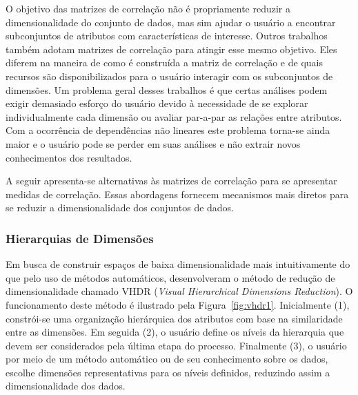 O objetivo das matrizes de correlação não é propriamente
reduzir a dimensionalidade do conjunto de dados, mas sim
ajudar o usuário a encontrar subconjuntos de atributos com
características de interesse. Outros trabalhos
\cite{Friendly2002,MacEachren2003,RBF2004,May2011ss,Johansson2009,Ingram2010,May2011}
também adotam matrizes de correlação para atingir esse mesmo
objetivo. Eles diferem na maneira de como é construída a
matriz de correlação e de quais recursos são
disponibilizados para o usuário interagir com os
subconjuntos de dimensões. Um problema geral desses
trabalhos é que certas análises podem exigir demasiado
esforço do usuário devido à necessidade de se explorar
individualmente cada dimensão ou avaliar par-a-par as
relações entre atributos. Com a ocorrência de dependências
não lineares este problema torna-se ainda maior e o usuário
pode se perder em suas análises e não extrair novos
conhecimentos dos resultados. 

A seguir apresenta-se alternativas às matrizes de correlação
para se apresentar medidas de correlação. Essas abordagens
fornecem mecanismos mais diretos para se reduzir a
dimensionalidade dos conjuntos de dados. 

\subsubsection{Hierarquias de Dimensões}

Em busca de construir espaços de baixa dimensionalidade mais
intuitivamente do que pelo uso de métodos automáticos,
\citet{Yang2003} desenvolveram o método de redução de
dimensionalidade chamado VHDR (\emph{Visual Hierarchical
Dimensions Reduction}). O funcionamento deste método é
ilustrado pela Figura~\ref{fig:vhdr1}. Inicialmente (1),
constrói-se uma organização hierárquica dos atributos com
base na similaridade entre as dimensões. Em seguida (2), o
usuário define os níveis da hierarquia que devem ser
considerados pela última etapa do processo. Finalmente (3), o
usuário por meio de um método automático ou de seu
conhecimento sobre os dados, escolhe dimensões
representativas para os níveis definidos, reduzindo assim a
dimensionalidade dos dados. 

